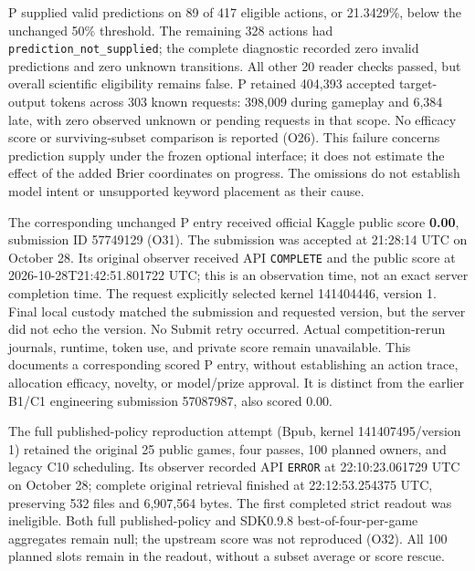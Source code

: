 \documentclass[11pt]{article}
\begin{document}
P supplied valid predictions on 89 of 417 eligible actions, or 21.3429\%, below the unchanged 50\% threshold. The remaining 328 actions had \texttt{prediction\_not\_supplied}; the complete diagnostic recorded zero invalid predictions and zero unknown transitions. All other 20 reader checks passed, but overall scientific eligibility remains false. P retained 404,393 accepted target-output tokens across 303 known requests: 398,009 during gameplay and 6,384 late, with zero observed unknown or pending requests in that scope. No efficacy score or surviving-subset comparison is reported (O26). This failure concerns prediction supply under the frozen optional interface; it does not estimate the effect of the added Brier coordinates on progress. The omissions do not establish model intent or unsupported keyword placement as their cause.

The corresponding unchanged P entry received official Kaggle public score \textbf{0.00}, submission ID 57749129 (O31). The submission was accepted at 21:28:14 UTC on October 28. Its original observer received API \texttt{COMPLETE} and the public score at 2026-10-28T21:42:51.801722 UTC; this is an observation time, not an exact server completion time. The request explicitly selected kernel 141404446, version 1. Final local custody matched the submission and requested version, but the server did not echo the version. No Submit retry occurred. Actual competition-rerun journals, runtime, token use, and private score remain unavailable. This documents a corresponding scored P entry, without establishing an action trace, allocation efficacy, novelty, or model/prize approval. It is distinct from the earlier B1/C1 engineering submission 57087987, also scored 0.00.

The full published-policy reproduction attempt (Bpub, kernel 141407495/version 1) retained the original 25 public games, four passes, 100 planned owners, and legacy C10 scheduling. Its observer recorded API \texttt{ERROR} at 22:10:23.061729 UTC on October 28; complete original retrieval finished at 22:12:53.254375 UTC, preserving 532 files and 6,907,564 bytes. The first completed strict readout was ineligible. Both full published-policy and SDK0.9.8 best-of-four-per-game aggregates remain null; the upstream score was not reproduced (O32). All 100 planned slots remain in the readout, without a subset average or score rescue.
\end{document}
